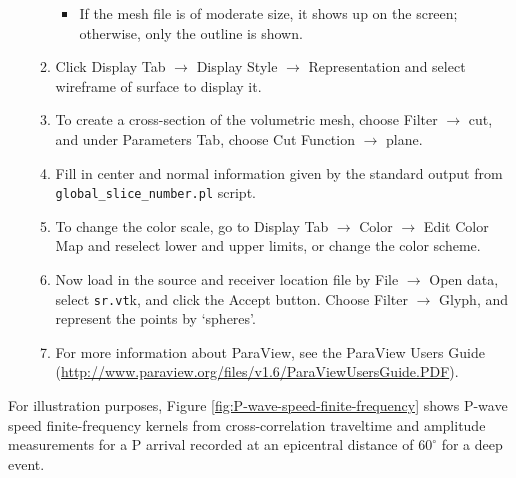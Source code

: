 \documentclass[oneside,english]{book}
\newcommand{\urlwithparentheses}[1]{(\url{#1})}
\begin{document}
\begin{enumerate}
\begin{enumerate}
\begin{itemize}
\item If the mesh file is of moderate size, it shows up on the screen; otherwise,
only the outline is shown.
\end{itemize}
\item Click \textsf{Display Tab} $\rightarrow$ \textsf{Display Style} $\rightarrow$
\textsf{Representation} and select \textsf{wireframe of surface} to
display it.
\item To create a cross-section of the volumetric mesh, choose \textsf{Filter}
$\rightarrow$ \textsf{cut}, and under \textsf{Parameters Tab}, choose
\textsf{Cut Function} $\rightarrow$ \textsf{plane}.
\item Fill in center and normal information given by the standard output
from \texttt{global\_slice\_number.pl} script.
\item To change the color scale, go to \textsf{Display Tab} $\rightarrow$
\textsf{Color} $\rightarrow$ \textsf{Edit Color Map} and reselect
lower and upper limits, or change the color scheme.
\item Now load in the source and receiver location file by \textsf{File}
$\rightarrow$\textsf{ Open data}, select \texttt{sr.vt}k, and click
the \textsf{Accept} button. Choose \textsf{Filter} $\rightarrow$\textsf{
Glyph}, and represent the points by `\textsf{spheres}'.
\item For more information about ParaView, see the ParaView Users Guide \urlwithparentheses{http://www.paraview.org/files/v1.6/ParaViewUsersGuide.PDF}.
\end{enumerate}
\end{enumerate}
For illustration purposes, Figure \ref{fig:P-wave-speed-finite-frequency}
shows P-wave speed finite-frequency kernels from cross-correlation traveltime and amplitude measurements for a P arrival recorded at an epicentral distance of $60^{\circ}$ for a deep event.
\end{document}
